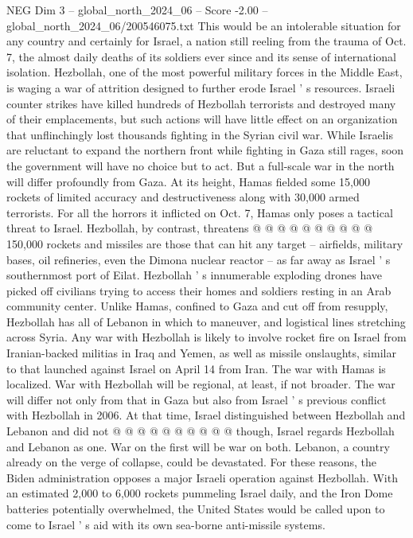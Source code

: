 \begin{textsample}{NEG Dim 3 – global\_north\_2024\_06 – Score -2.00 – global\_north\_2024\_06/200546075.txt}  \label{ex:f3_neg_388}
This would be an intolerable situation for any country and certainly for Israel, a nation still reeling from the trauma of Oct. 7, the almost daily deaths of its soldiers ever since and its sense of international isolation.
Hezbollah, one of the most powerful military forces in the Middle East, is waging a war of attrition designed to further erode Israel ' s resources.
Israeli counter strikes have killed hundreds of Hezbollah terrorists and destroyed many of their emplacements, but such actions will have little effect on an organization that unflinchingly lost thousands fighting in the Syrian civil war.
While Israelis are reluctant to expand the northern front while fighting in Gaza still rages, soon the government will have no choice but to act.
But a full-scale war in the north will differ profoundly from Gaza.
At its height, Hamas fielded some 15,000 rockets of limited accuracy and destructiveness along with 30,000 armed terrorists.
For all the horrors it inflicted on Oct. 7, Hamas only poses a tactical threat to Israel.
Hezbollah, by contrast, threatens @ @ @ @ @ @ @ @ @ @ 150,000 rockets and missiles are those that can hit any target -- airfields, military bases, oil refineries, even the Dimona nuclear reactor -- as far away as Israel ' s southernmost port of Eilat.
Hezbollah ' s innumerable exploding drones have picked off civilians trying to access their homes and soldiers resting in an Arab community center.
Unlike Hamas, confined to Gaza and cut off from resupply, Hezbollah has all of Lebanon in which to maneuver, and logistical lines stretching across Syria.
Any war with Hezbollah is likely to involve rocket fire on Israel from Iranian-backed militias in Iraq and Yemen, as well as missile onslaughts, similar to that launched against Israel on April 14 from Iran.
The war with Hamas is localized.
War with Hezbollah will be regional, at least, if not broader.
The war will differ not only from that in Gaza but also from Israel ' s previous conflict with Hezbollah in 2006.
At that time, Israel distinguished between Hezbollah and Lebanon and did not @ @ @ @ @ @ @ @ @ @ though, Israel regards Hezbollah and Lebanon as one.
War on the first will be war on both.
Lebanon, a country already on the verge of collapse, could be devastated.
For these reasons, the Biden administration opposes a major Israeli operation against Hezbollah.
With an estimated 2,000 to 6,000 rockets pummeling Israel daily, and the Iron Dome batteries potentially overwhelmed, the United States would be called upon to come to Israel ' s aid with its own sea-borne anti-missile systems.

\end{textsample}
